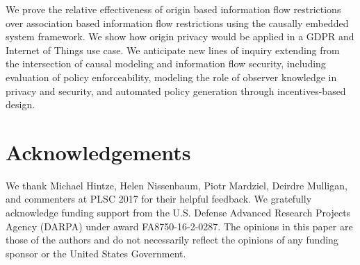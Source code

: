 \documentclass[../thesis.tex]{subfiles}
\begin{document}
We prove the relative effectiveness of
origin based information flow restrictions over
association based information flow restrictions
using the causally embedded system framework.
We show how origin privacy would be applied in
a GDPR and Internet of Things use case.
We anticipate new lines of inquiry extending
from the intersection of causal modeling
and information flow security, including
evaluation of policy enforceability,
modeling the role of observer knowledge
in privacy and security, and automated
policy generation through incentives-based
design.

\section{Acknowledgements}
\label{sec:orgheadline39}

We thank Michael Hintze, Helen Nissenbaum, Piotr Mardziel,
Deirdre Mulligan, 
and commenters at PLSC 2017 for
their helpful feedback.
We gratefully acknowledge funding support 
from the U.S. Defense Advanced Research Projects
Agency (DARPA) under
award FA8750-16-2-0287.
The opinions in this paper are those of the authors and do not
necessarily reflect the opinions of any funding sponsor or the United States Government.
\end{document}
